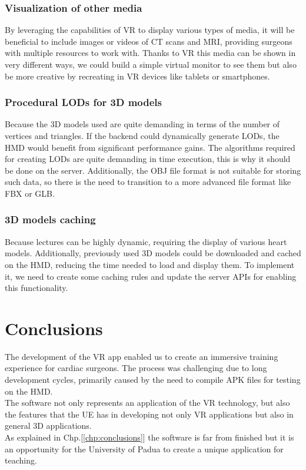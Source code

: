 \subsection{Visualization of other media}
\noindent
By leveraging the capabilities of \ac{VR} to display various types of media, it will be beneficial to include images or videos of \ac{CT} scans and \ac{MRI}, providing surgeons with multiple resources to work with.
Thanks to \ac{VR} this media can be shown in very different ways, we could build a simple virtual monitor to see them but also be more creative by recreating in \ac{VR} devices like tablets or smartphones.

\subsection{Procedural LODs for 3D models}
\noindent
Because the 3D models used are quite demanding in terms of the number of vertices and triangles. If the backend could dynamically generate \ac{LOD}s, the \ac{HMD} would benefit from significant performance gains.
The algorithms required for creating \ac{LOD}s are quite demanding in time execution, this is why it should be done on the server.
Additionally, the OBJ file format is not suitable for storing such data, so there is the need to transition to a more advanced file format like FBX or GLB.

\subsection{3D models caching}
\noindent
Because lectures can be highly dynamic, requiring the display of various heart models. Additionally, previously used 3D models could be downloaded and cached on the \ac{HMD}, reducing the time needed to load and display them.
To implement it, we need to create some caching rules and update the server \ac{API}s for enabling this functionality.

\chapter{Conclusions}
\noindent
The development of the \ac{VR} app enabled us to create an immersive training experience for cardiac surgeons.
The process was challenging due to long development cycles, primarily caused by the need to compile \ac{APK} files for testing on the \ac{HMD}.\\
The software not only represents an application of the \ac{VR} technology, but also the features  that the \ac{UE} has in developing not only \ac{VR} applications but also in general 3D applications.\\
As explained in Chp.[\ref{chp:conclusions}] the software is far from finished but it is an opportunity for the University of Padua to create a unique application for teaching.\\